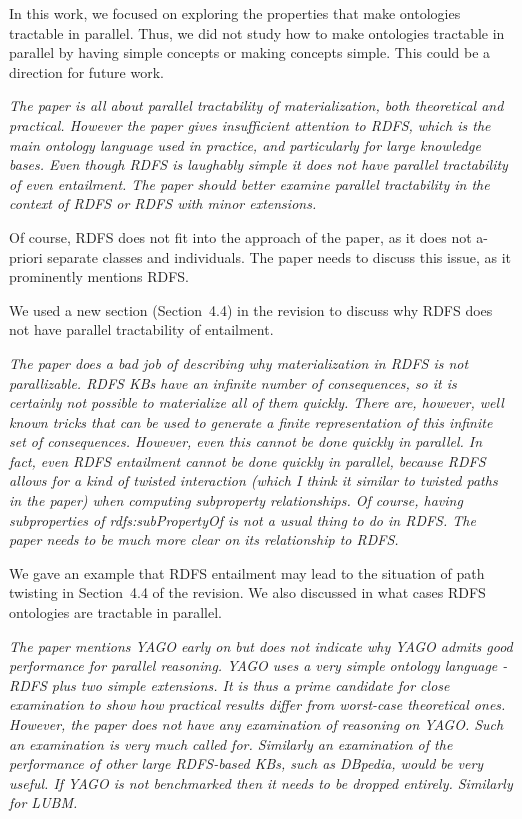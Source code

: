 \documentclass{article}
\let\quoteOld\quote
\let\endquoteOld\endquote
\renewenvironment{quote}{\quoteOld\itshape}{\endquoteOld}
\begin{document}
In this work, we focused on exploring the properties
that make ontologies tractable in parallel. Thus, we did not study how to make ontologies
tractable in parallel by having simple concepts or making concepts
simple. This could be a direction for future work.


\begin{quote}
The paper is all about parallel tractability of materialization, both
theoretical and practical.  However the paper gives insufficient attention
to RDFS, which is the main ontology language used in practice, and
particularly for large knowledge bases.  Even though RDFS is laughably
simple it does not have parallel tractability of even entailment.  The paper
should better examine parallel tractability in the context of RDFS or RDFS
with minor extensions.

Of course, RDFS does not fit into the approach of the paper, as it does not
a-priori separate classes and individuals.  The paper needs to discuss this
issue, as it prominently mentions RDFS.
\end{quote}

We used a new section (Section~4.4) in the revision to discuss why RDFS
does not have parallel tractability of entailment.

\begin{quote}
The paper does a bad job of describing why materialization in RDFS is not
parallizable.  RDFS KBs have an infinite number of consequences, so it is
certainly not possible to materialize all of them quickly.  There are,
however, well known tricks that can be used to generate a finite
representation of this infinite set of consequences.  However, even this
cannot be done quickly in parallel.  In fact, even RDFS entailment cannot be
done quickly in parallel, because RDFS allows for a kind of twisted
interaction (which I think it similar to twisted paths in the paper) when
computing subproperty relationships.  Of course, having subproperties of
rdfs:subPropertyOf is not a usual thing to do in RDFS.  The paper needs to
be much more clear on its relationship to RDFS.
\end{quote}

We gave an example that RDFS entailment may lead to the situation of path twisting in Section~4.4 of the revision.
We also discussed in what cases RDFS ontologies are tractable in parallel.

\begin{quote}
The paper mentions YAGO early on but does not indicate why YAGO admits good
performance for parallel reasoning.  YAGO uses a very simple ontology
language - RDFS plus two simple extensions.  It is thus a prime candidate
for close examination to show how practical results differ from worst-case
theoretical ones.  However, the paper does not have any examination of
reasoning on YAGO.  Such an examination is very much called for.  Similarly
an examination of the performance of other large RDFS-based KBs, such as
DBpedia, would be very useful.   If YAGO is not benchmarked then it needs to
be dropped entirely.   Similarly for LUBM.
\end{quote}
\end{document}
